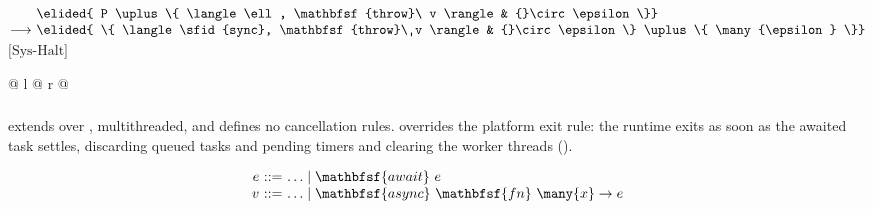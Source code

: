 \vspace{1em}
\noindent
$\begin{array}[t]{@{}r@{\ }l@{}l@{}}
                & \elided{ P \uplus \{ \langle \ell, \mathbfsf{throw}\ v \rangle & {}\circ \epsilon \}} \\
\longrightarrow & \elided{ \{ \langle \sfid{sync}, \mathbfsf{throw}\ v \rangle & {}\circ \epsilon \} \uplus \{ \many{\epsilon} \}}
\end{array}$\hfill$\text{[Sys-Halt]}$\par
\noindent
\begin{tabular*}{\linewidth}{@{} l @{\extracolsep{\fill}} r @{}}
\end{tabular*}
\subsubsection{\CSharp}

\CSharp{} extends \lasync over \exn, multithreaded, and defines no cancellation rules.  overrides the platform exit rule: the runtime exits as soon as the awaited task settles, discarding queued tasks and pending timers and clearing the worker threads (\terminated \destruction).

$$
\begin{array}{r@{\ }c@{\ }l}
e & ::= & \ldots \mid \mathbfsf{await}\ e \\
v & ::= & \ldots \mid \mathbfsf{async}\ \mathbfsf{fn}\ \many{x} \to e
\end{array}
$$

